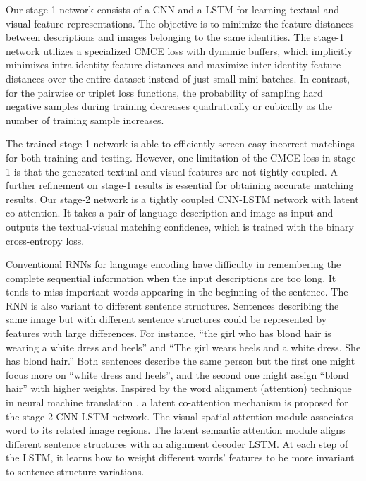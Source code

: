 Our stage-1 network consists of a CNN and a LSTM for learning textual and visual feature representations. The objective is to minimize the feature distances between descriptions and images belonging to the same identities.
The stage-1 network utilizes a specialized CMCE loss with dynamic buffers, which implicitly minimizes intra-identity feature distances and maximize inter-identity feature distances over the entire dataset instead of just small mini-batches. In contrast, for the pairwise or triplet loss functions, the probability of sampling hard negative samples during training decreases quadratically or cubically as the number of training sample increases.

The trained stage-1 network is able to efficiently screen easy incorrect matchings for both training and testing. However, one limitation of the CMCE loss in stage-1 is that the generated textual and visual features are not tightly coupled.
A further refinement on stage-1 results is essential for obtaining accurate matching results. Our stage-2 network is a tightly coupled CNN-LSTM network with latent co-attention. It takes a pair of language description and image as input and outputs the textual-visual matching confidence, which is trained with the binary cross-entropy loss.

Conventional RNNs for language encoding have difficulty in remembering the complete sequential information when the input descriptions are too long. It tends to miss important words appearing in the beginning of the sentence.
The RNN is also variant to different sentence structures. Sentences describing the same image but with different sentence structures could be represented by features with large differences. For instance, ``the girl who has blond hair is wearing a white dress and heels'' and ``The girl wears heels and a white dress. She has blond hair.'' Both sentences describe the same person but the first one might focus more on ``white dress and heels'', and the second one might assign ``blond hair'' with higher weights.
Inspired by the word alignment (attention) technique in neural machine translation \cite{bahdanau2014neural}, a latent co-attention mechanism is proposed for the stage-2 CNN-LSTM network. The visual spatial attention module associates word to its related image regions. The latent semantic attention module aligns different sentence structures with an alignment decoder LSTM. At each step of the LSTM, it learns how to weight different words' features to be more invariant to sentence structure variations.

